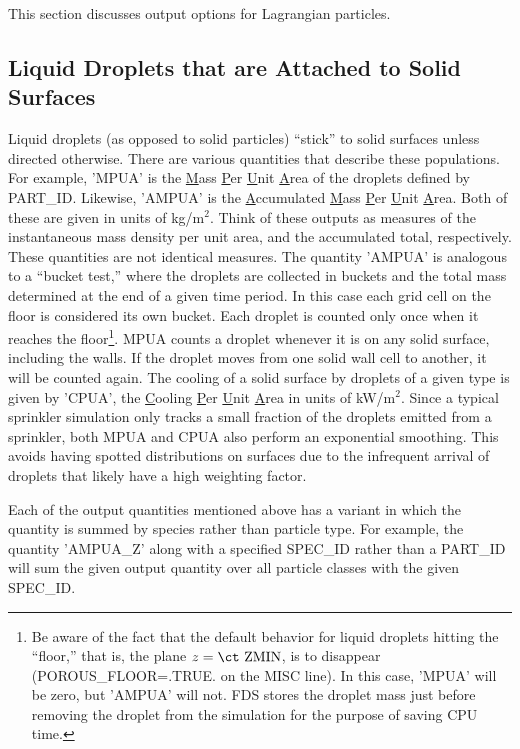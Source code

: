 \documentclass[11pt]{book}
\begin{document}
This section discusses output options for Lagrangian particles.

\subsection{Liquid Droplets that are Attached to Solid Surfaces}
\label{bucket_test_1}

Liquid droplets (as opposed to solid particles) ``stick'' to solid surfaces unless directed otherwise. There are various quantities that describe these populations. For example, {\ct 'MPUA'} is the \underline{M}ass \underline{P}er \underline{U}nit \underline{A}rea of the droplets defined by {\ct PART\_ID}. Likewise, {\ct 'AMPUA'} is the \underline{A}ccumulated \underline{M}ass \underline{P}er \underline{U}nit \underline{A}rea. Both of these are given in units of kg/m$^2$. Think of these outputs as measures of the instantaneous mass density per unit area, and the accumulated total, respectively. These quantities are not identical measures.  The quantity {\ct 'AMPUA'} is analogous to a ``bucket test,'' where the droplets are collected in buckets and the total mass determined at the end of a given time period. In this case each grid cell on the floor is considered its own bucket.  Each droplet is counted only once when it reaches the floor\footnote{Be aware of the fact that the default behavior for liquid droplets hitting the ``floor,'' that is, the plane $z=\hbox{\ct ZMIN}$, is to disappear ({\ct POROUS\_FLOOR=.TRUE.} on the {\ct MISC} line). In this case, {\ct 'MPUA'} will be zero, but {\ct 'AMPUA'} will not. FDS stores the droplet mass just before removing the droplet from the simulation for the purpose of saving CPU time.}. {\ct MPUA} counts a droplet whenever it is on any solid surface, including the walls. If the droplet moves from one solid wall cell to another, it will be counted again. The cooling of a solid surface by droplets of a given type is given by {\ct 'CPUA'}, the \underline{C}ooling \underline{P}er \underline{U}nit \underline{A}rea in units of kW/m$^2$. Since a typical sprinkler simulation only tracks a small fraction of the droplets emitted from a sprinkler, both {\ct MPUA} and {\ct CPUA} also perform an exponential smoothing. This avoids having spotted distributions on surfaces due to the infrequent arrival of droplets that likely have a high weighting factor.

Each of the output quantities mentioned above has a variant in which the quantity is summed by species rather than particle type. For example, the quantity {\ct 'AMPUA\_Z'} along with a specified {\ct SPEC\_ID} rather than a {\ct PART\_ID} will sum the given output quantity over all particle classes with the given {\ct SPEC\_ID}.
\end{document}
